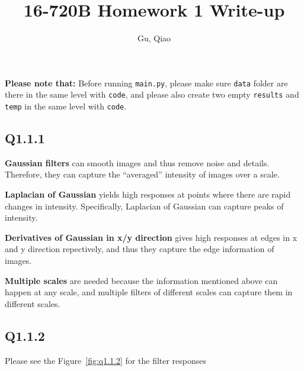 \documentclass[11pt]{article}
\newcommand{\code}[1]{\texttt{#1}}
\begin{document}
\author{Gu, Qiao}
\title{16-720B Homework 1 Write-up}
\maketitle

\medskip

\textbf{Please note that:} Before running \code{main.py}, please make sure \code{data} folder are there in the same level with \code{code}, and please also create two empty \code{results} and \code{temp} in the same level with \code{code}. 

\subsection*{Q1.1.1}

\textbf{Gaussian filters} can smooth images and thus remove noise and details. Therefore, they can capture the ``averaged'' intensity of images over a scale.

\textbf{Laplacian of Gaussian} yields high responses at points where there are rapid changes in intensity. Specifically, Laplacian of Gaussian can capture peaks of intensity.

\textbf{Derivatives of Gaussian in x/y direction} gives high responses at edges in x and y direction repectively, and thus they capture the edge information of images.

\textbf{Multiple scales} are needed because the information mentioned above can happen at any scale, and multiple filters of different scales can capture them in different scales.

\newpage

\subsection*{Q1.1.2}

Please see the Figure~\ref{fig:q1.1.2} for the filter responses
\end{document}
